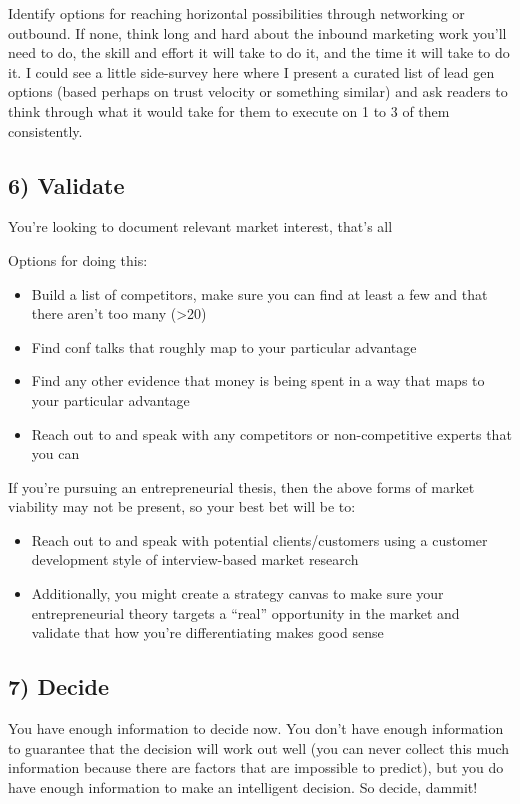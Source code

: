 Identify options for reaching horizontal possibilities through networking or outbound. If none, think long and hard about the inbound marketing work you'll need to do, the skill and effort it will take to do it, and the time it will take to do it. I could see a little side-survey here where I present a curated list of lead gen options (based perhaps on trust velocity or something similar) and ask readers to think through what it would take for them to execute on 1 to 3 of them consistently.

\subsection{6) Validate}

You're looking to document relevant market interest, that's all

Options for doing this:

\begin{itemize}
\item Build a list of competitors, make sure you can find at least a few and that there aren't too many (\textgreater{}20)
\item Find conf talks that roughly map to your particular advantage
\item Find any other evidence that money is being spent in a way that maps to your particular advantage
\item Reach out to and speak with any competitors or non-competitive experts that you can
\end{itemize}

If you're pursuing an entrepreneurial thesis, then the above forms of market viability may not be present, so your best bet will be to:

\begin{itemize}
\item Reach out to and speak with potential clients/customers using a customer development style of interview-based market research
\item Additionally, you might create a strategy canvas to make sure your entrepreneurial theory targets a ``real'' opportunity in the market and validate that how you're differentiating makes good sense
\end{itemize}

\subsection{7) Decide}

You have enough information to decide now. You don't have enough information to guarantee that the decision will work out well (you can never collect this much information because there are factors that are impossible to predict), but you do have enough information to make an intelligent decision. So decide, dammit!

